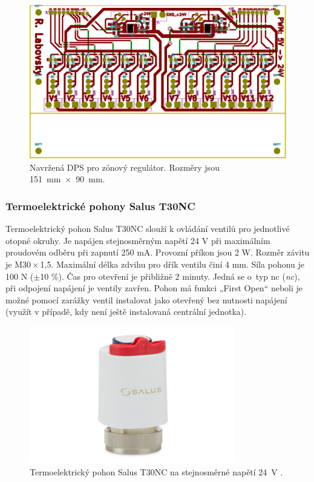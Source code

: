 \begin{figure}[H]
    \centering
    \includegraphics[width=\textwidth]{images/svg/kicad/dps-zonovy-regulator.eps}
    \caption[Navržená DPS pro zónový regulátor.]{Navržená DPS pro zónový regulátor. Rozměry jsou 151~mm~×~90~mm.}
    \label{fig:dps-zonovy-regulator}
\end{figure}

\subsubsection{Termoelektrické pohony Salus T30NC}  
Termoelektrický pohon Salus T30NC slouží k ovládání ventilů pro jednotlivé otopné okruhy. Je napájen stejnosměrným napětí 24 V při maximálním proudovém odběru při zapnutí 250 mA. Provozní příkon jsou 2 W. Rozměr závitu je M30\,×\,1,5. Maximální délka zdvihu pro dřík ventilu činí 4 mm. Síla pohonu je 100 N ($\pm$10 \%). Čas pro otevření je přibližně 2 minuty. Jedná se o~typ \acrshort{nc} (\textit{\acrlong{nc}}), při odpojení napájení je ventily zavřen. Pohon má funkci „First Open“ neboli je možné pomocí zarážky ventil instalovat jako otevřený bez nutnosti napájení (využít v případě, kdy není ještě instalovaná centrální jednotka).

\begin{figure}[H]
    \centering
    \includegraphics[width=0.8\textwidth]{images/termoelektricky-pohon-salus-t30nc-24-v.png}
    \caption[Termoelektrický pohon Salus T30NC na stejnosměrné napětí 24 V.]{Termoelektrický pohon Salus T30NC na stejnosměrné napětí 24~V \cite{termoelektricky-pohon-t30nc}.}
    \label{fig:termoelektricky-pohon-salus-t30nc-24-v}
\end{figure}

